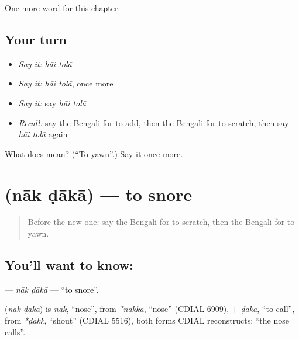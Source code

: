 \begin{grammarlens}[title={What you've built}]
One more word for this chapter.
\end{grammarlens}

\subsection*{Your turn}
\begin{itemize}
\raggedright
  \item \emph{Say it:} \emph{hāi tolā}
  \item \emph{Say it:} \emph{hāi tolā}, once more
  \item \emph{Say it:} say \emph{hāi tolā}
  \item \emph{Recall:} say the Bengali for to add, then the Bengali for to scratch, then say \emph{hāi tolā} again
\end{itemize}

\begin{tcolorbox}[breakable,colback=teal!4,colframe=teal!35!black,title={Before you move on}]
What does   mean? (\textquotedblleft{}To yawn\textquotedblright{}.) Say it once more.
\end{tcolorbox}
\section[\texorpdfstring{\bn{নাক} \bn{ডাকা} (nāk ḍākā)}{নাক ডাকা (nāk ḍākā)}]{  (nāk ḍākā) — to snore}

\label{lesson:BN-C183-nak-daka}



\begin{quote}
Before the new one: say the Bengali for to scratch, then the Bengali for to yawn.
\end{quote}

\subsection*{You'll want to know:  }
\textbf{ } — \emph{nāk ḍākā} — \textquotedblleft{}to snore\textquotedblright{}.

\begin{cousinweb}
\textbf{ } (\emph{nāk ḍākā}) is \emph{nāk}, \textquotedblleft{}nose\textquotedblright{}, from \emph{*nakka}, \textquotedblleft{}nose\textquotedblright{} (CDIAL 6909), + \emph{ḍākā}, \textquotedblleft{}to call\textquotedblright{}, from \emph{*ḍakk}, \textquotedblleft{}shout\textquotedblright{} (CDIAL 5516), both forms CDIAL reconstructs: \textquotedblleft{}the nose calls\textquotedblright{}.
\end{cousinweb}

